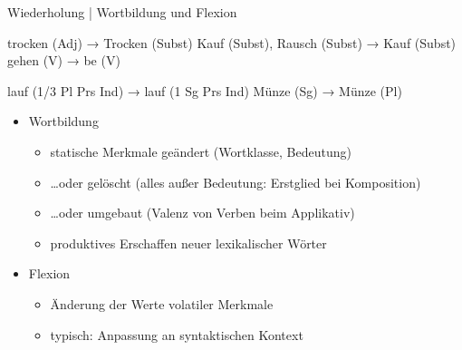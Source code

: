 \begin{frame}
  {Wiederholung | Wortbildung und Flexion}
  \onslide<+->
  \begin{exe}
    \ex
    \begin{xlist}
      \ex trocken (Adj) → \alert{Trocken} (Subst)
      \ex Kauf (Subst), Rausch (Subst) → \alert{Kauf} (Subst)
      \ex gehen (V) → \alert{be} (V)
    \end{xlist}
    \onslide<+->
    \ex
    \begin{xlist}
      \ex \alert{lauf} (1\slash 3 Pl Prs Ind) → \alert{lauf} (1 Sg Prs Ind)
      \ex \alert{Münze} (Sg) → \alert{Münze} (Pl)
    \end{xlist}
  \end{exe}
  \Halbzeile
  \begin{itemize}[<+->]
    \item Wortbildung
      \begin{itemize}[<+->]
        \item statische Merkmale geändert (Wortklasse, Bedeutung)
        \item \ldots oder gelöscht (alles außer Bedeutung: Erstglied bei Komposition)
        \item \ldots oder umgebaut (Valenz von Verben beim Applikativ)
        \item \alert{produktives Erschaffen neuer lexikalischer Wörter}
      \end{itemize}
  \Halbzeile
    \item Flexion
      \begin{itemize}
        \item Änderung der Werte volatiler Merkmale
        \item typisch: Anpassung an syntaktischen Kontext
      \end{itemize}
  \end{itemize}
\end{frame}

